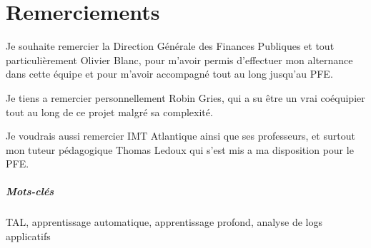 \documentclass[openany, 11pt]{memoir}
\newcommand\chapters[1]{
	\chapter*{#1}
	\addcontentsline{toc}{chapter}{#1}
}
\begin{document}
\newpage
{}
\tableofcontents
{}

\newpage
\chapters{Remerciements}
Je souhaite remercier la Direction Générale des Finances Publiques et tout particulièrement Olivier Blanc, pour m'avoir permis d'effectuer mon alternance dans cette équipe et pour m'avoir accompagné tout au long jusqu'au PFE.

\bigskip
Je tiens a remercier personnellement Robin Gries, qui a su être un vrai coéquipier tout au long de ce projet malgré sa complexité.

\bigskip
Je voudrais aussi remercier IMT Atlantique ainsi que ses professeurs, et surtout mon tuteur pédagogique Thomas Ledoux qui s'est mis a ma disposition pour le PFE.

\newpage
\begin{abstract}
Les \glspl{log} sont une source importante de données détaillant le fonctionnement interne d'une application, mais ne sont pourtant que rarement utilisés a leur plein potentiel. Dans ce mémoire, je vais détailler le processus d'évolution d'un outil d'\gls{ml} qui utilise les \glspl{log} pour détecter et même tenter de prévoir des anomalies logicielles. Le projet s'apparentant plus a un projet de recherche, la démarche scientifique sera détaillée, ainsi que les caractéristiques techniques et le déroulement de l'implémentation. L'organisation du projet avec un stagiaire et moi-même sera développée, ainsi que ses impacts humains et économiques.
\end{abstract}

{ 
\begin{abstract}
\Glspl{log} are an important source of data when it comes to the internal workings of software, but they are rarely used to their full potential. In this memoir, I will explain the evolution of a machine learning tool which uses \glspl{log} to detect and even attempt to predict software anomalies. The project being similar to a research project, the scientific protocol will be detailed, as well as the technical characteristics and the course of the implementation. Project management with an intern and myself will be developed, as well as the human and economic impacts of the project.
\end{abstract}}

\paragraph{Mots-clés}
\gls{TAL}, apprentissage automatique, apprentissage profond, analyse de logs applicatifs
\end{document}
